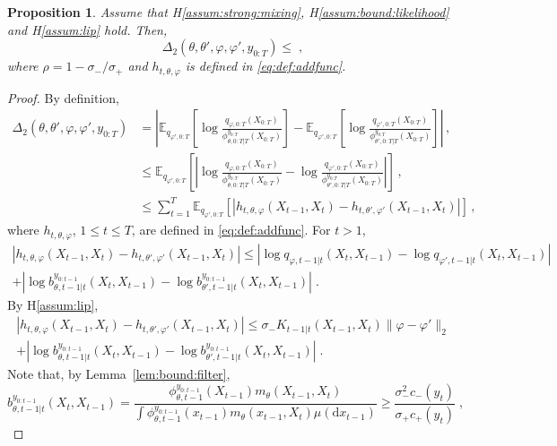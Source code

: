 \documentclass{article}
\newtheorem{proposition}[theorem]{Proposition}
\newcommand{\udlow}{\sigma_-}
\newcommand{\udup}{\sigma_+}
\newcommand{\1}{\mathbbm{1}}
\newcommand{\rmd}{\ensuremath{\mathrm{d}}}
\newcommand{\eqsp}{\;}
\begin{document}
\begin{proposition}
Assume that H\ref{assum:strong:mixing}, H\ref{assum:bound:likelihood} and H\ref{assum:lip} hold. Then,
$$
\Delta_2(\theta, \theta', \varphi, \varphi', y_{0:T}) \leq  \eqsp,
$$
where $\rho = 1-\udlow/\udup$ and $h_{t,\theta,\varphi}$ is defined in \eqref{eq:def:addfunc}.
\end{proposition}
\begin{proof}
By definition, 
\begin{align*}
\Delta_2(\theta, \theta', \varphi, \varphi', y_{0:T}) &= \left|\mathbb{E}_{q_{\varphi',0:T}}\left[\log \frac{q_{\varphi,0:T}(X_{0:T})}{\phi^{y_{0:T}}_{\theta,0:T|T}(X_{0:T})}\right] - \mathbb{E}_{q_{\varphi',0:T}}\left[\log \frac{q_{\varphi',0:T}(X_{0:T})}{\phi^{y_{0:T}}_{\theta',0:T|T}(X_{0:T})}\right]\right|\,,\\
&\leq \mathbb{E}_{q_{\varphi',0:T}}\left[\left|\log \frac{q_{\varphi,0:T}(X_{0:T})}{\phi^{y_{0:T}}_{\theta,0:T|T}(X_{0:T})} - \log \frac{q_{\varphi',0:T}(X_{0:T})}{\phi^{y_{0:T}}_{\theta',0:T|T}(X_{0:T})}\right|\right]\,,\\
&\leq \sum_{t=1}^T\mathbb{E}_{q_{\varphi',0:T}}\left[\left|h_{t,\theta,\varphi}(X_{t-1},X_t)-h_{t,\theta',\varphi'}(X_{t-1},X_t)\right|\right]\,,
\end{align*}
where $h_{t,\theta,\varphi}$, $1\leq t\leq T$,  are defined in \eqref{eq:def:addfunc}. For $t>1$,
\begin{multline*}
\left|h_{t,\theta,\varphi}(X_{t-1},X_t)-h_{t,\theta',\varphi'}(X_{t-1},X_t)\right| \leq \left|\log q_{\varphi,t-1|t}(X_t,X_{t-1}) - \log q_{\varphi',t-1|t}(X_t,X_{t-1})\right|\\
+ \left|\log b^{y_{0:t-1}}_{\theta,t-1|t}(X_t,X_{t-1})- \log b^{y_{0:t-1}}_{\theta',t-1|t}(X_t,X_{t-1})\right|\eqsp.
\end{multline*}
By H\ref{assum:lip},
\begin{multline*}
\left|h_{t,\theta,\varphi}(X_{t-1},X_t)-h_{t,\theta',\varphi'}(X_{t-1},X_t)\right| \leq \sigma_- K_{t-1|t}(X_{t-1},X_t)\|\varphi-\varphi'\|_2 \\
+ \left|\log b^{y_{0:t-1}}_{\theta,t-1|t}(X_t,X_{t-1})- \log b^{y_{0:t-1}}_{\theta',t-1|t}(X_t,X_{t-1})\right|\eqsp.
\end{multline*}
Note that, by Lemma~\ref{lem:bound:filter},
$$
b^{y_{0:t-1}}_{\theta,t-1|t}(X_t,X_{t-1}) = \frac{\phi_{\theta,t-1}^{y_{0:t-1}}(X_{t-1})m_\theta(X_{t-1},X_t)}{\int \phi_{\theta,t-1}^{y_{0:t-1}}(x_{t-1})m_\theta(x_{t-1},X_t)\mu(\rmd x_{t-1})}\geq \frac{\sigma^2_-c_-(y_t)}{\sigma_+c_+(y_t)}\eqsp,
$$
\end{proof}
\end{document}

